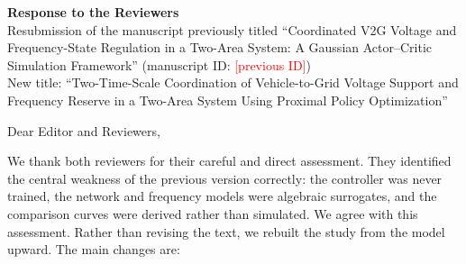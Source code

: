 \documentclass[10pt,a4paper]{article}
\begin{document}
\begin{center}
{\large\bfseries Response to the Reviewers}\\[4pt]
Resubmission of the manuscript previously titled ``Coordinated V2G Voltage and Frequency-State Regulation in a Two-Area System: A Gaussian Actor--Critic Simulation Framework'' (manuscript ID: \textcolor{red}{[previous ID]})\\[2pt]
New title: ``Two-Time-Scale Coordination of Vehicle-to-Grid Voltage Support and Frequency Reserve in a Two-Area System Using Proximal Policy Optimization''
\end{center}

Dear Editor and Reviewers,

We thank both reviewers for their careful and direct assessment. They
identified the central weakness of the previous version correctly: the
controller was never trained, the network and frequency models were
algebraic surrogates, and the comparison curves were derived rather
than simulated. We agree with this assessment. Rather than revising
the text, we rebuilt the study from the model upward. The main changes
are:
\end{document}
